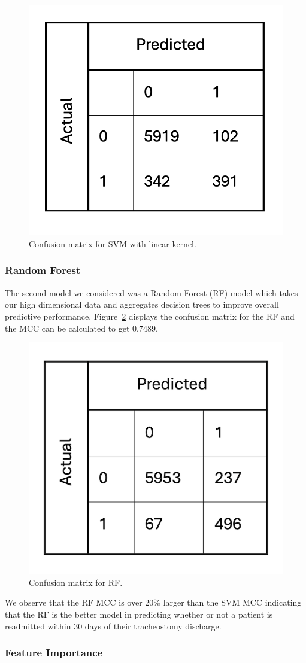 \documentclass[sn-basic,pdflatex]{sn-jnl}
\theoremstyle{remark}
\theoremstyle{definition}
\begin{document}
\begin{figure}[H]

{\centering \includegraphics[width=0.3\linewidth]{figures/svm_conf} 

}

\caption{Confusion matrix for SVM with linear kernel.}\label{fig:svm_conf}
\end{figure}

\hypertarget{sec4AC}{%
\subsubsection{Random Forest}\label{sec4AC}}

The second model we considered was a Random Forest (RF) model which
takes our high dimensional data and aggregates decision trees to improve
overall predictive performance. Figure~\ref{fig:rf_conf} displays the
confusion matrix for the RF and the MCC can be calculated to get 0.7489.

\begin{figure}[H]

{\centering \includegraphics[width=0.3\linewidth]{figures/rf_conf} 

}

\caption{Confusion matrix for RF.}\label{fig:rf_conf}
\end{figure}

We observe that the RF MCC is over 20\% larger than the SVM MCC
indicating that the RF is the better model in predicting whether or not
a patient is readmitted within 30 days of their tracheostomy discharge.

\hypertarget{sec4ACA}{%
\subsubsection{Feature Importance}\label{sec4ACA}}
\end{document}
